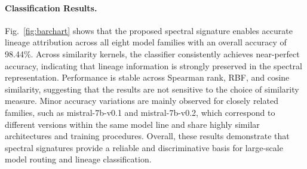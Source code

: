 \paragraph{Classification Results.}
Fig.~\ref{fig:barchart} shows that the proposed spectral signature enables accurate lineage attribution across all eight model families with an overall accuracy of 98.44\%. Across similarity kernels, the classifier consistently achieves near-perfect accuracy, indicating that lineage information is strongly preserved in the spectral representation. Performance is stable across Spearman rank, RBF, and cosine similarity, suggesting that the results are not sensitive to the choice of similarity measure. 
%
Minor accuracy variations are mainly observed for closely related families, such as mistral-7b-v0.1 and mistral-7b-v0.2, which correspond to different versions within the same model line and share highly similar architectures and training procedures.
%
Overall, these results demonstrate that spectral signatures provide a reliable and discriminative basis for large-scale model routing and lineage classification.


